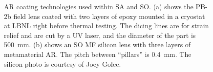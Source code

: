 \begin{figure}[!t]
    \centering
    \caption{AR coating technologies used within SA and SO. (a) shows the PB-2b field lens coated with two layers of epoxy mounted in a cryostat at LBNL right before thermal testing. The dicing lines are for strain relief and are cut by a UV laser, and the diameter of the part is 500~mm. (b) shows an SO MF silicon lens with three layers of metamaterial AR. The pitch between ``pillars'' is 0.4~mm. The silicon photo is courtesy of Joey Golec.}
    \label{fig:cmb_instrument_ar_coatings}
\end{figure}

